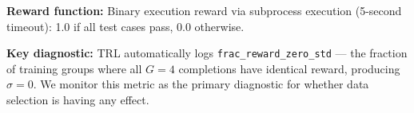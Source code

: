\textbf{Reward function:} Binary execution reward via subprocess execution (5-second timeout): 1.0 if all test cases pass, 0.0 otherwise.

\textbf{Key diagnostic:} TRL automatically logs \texttt{frac\_reward\_zero\_std} --- the fraction of training groups where all $G=4$ completions have identical reward, producing $\sigma=0$. We monitor this metric as the primary diagnostic for whether data selection is having any effect.
